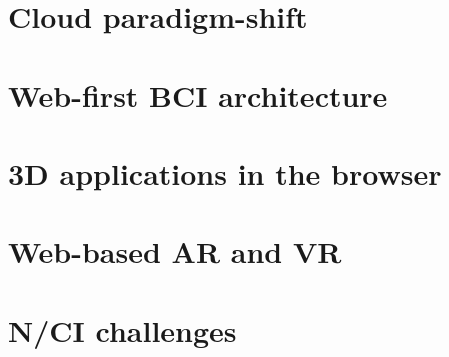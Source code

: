 
\section{Cloud paradigm-shift}
\label{chapter2-cloud-paradigm-shift}


\section{Web-first BCI architecture}
\label{chapter2-web-first-bci-architecture}


\section{3D applications in the browser}
\label{chapter2-3d-applications-in-the-browser}


\section{Web-based AR and VR}
\label{chapter2-web-based-ar-and-vr}


\section{N/CI challenges}
\label{chapter2-nci-challenges}


